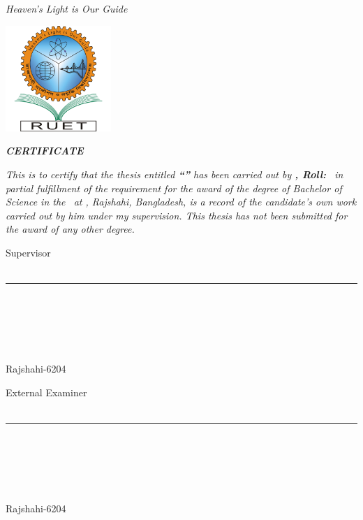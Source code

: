 
\begin{center}
    \textit{Heaven's Light is Our Guide}
    \vspace{8mm}

    \includegraphics[height=4cm]{imgs/ruetlogo.pdf}
    \vspace{8mm}
    
    \textbf{{\fontsize{14pt}{0.5cm}\selectfont \dept}}
    \vspace{8mm}
    
    \textbf{{\fontsize{14pt}{0.5cm}\selectfont \ruet}}
    \vspace{8mm}

    \textbf{{\fontsize{16pt}{0.5cm}\selectfont \textit{CERTIFICATE}}}
    \vspace{8mm}
\end{center}

\noindent\textit{%
This is to certify that the thesis entitled \textbf{“\thesistitle”} has been carried out by \textbf{\authorname, Roll: \authorroll}\ in partial fulfillment of the requirement for the award of the degree of Bachelor of Science in the \dept\ at \ruet, Rajshahi, Bangladesh, is a record of the candidate's own work carried out by him under my supervision. This thesis has not been submitted for the award of any other degree.
}

\vfill

\begin{minipage}{0.45\linewidth}
    Supervisor\\
    \hfill\\
    \hrule
    \hfill\\
    \textbf{\thesissupervisor}\\
    \thesissupervisordesignation\\
    \dept\\
    \ruet\\
    Rajshahi-6204
\end{minipage}
\hfill
\begin{minipage}{0.45\linewidth}
    External Examiner\\
    \hfill\\
    \hrule
    \hfill\\
    \textbf{\external}\\
    \externaldesig\\
    \dept\\
    \ruet\\
    Rajshahi-6204
\end{minipage}